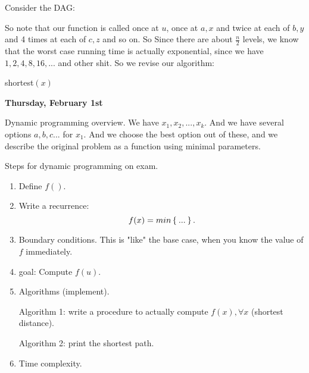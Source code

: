 \documentclass[reqno]{amsbook}
\makeatletter
\theoremstyle{plain}
\numberwithin{section}{chapter}
\numberwithin{equation}{chapter}
\theoremstyle{definition}
\theoremstyle{remark}
\newcommand{\fracc}{\frac}
\newenvironment{restoretext}%
    {\@parboxrestore%
     \begin{adjustwidth}{}{\leftmargin}%
    }{\end{adjustwidth}
     }
\makeatother
\begin{document}
Consider the DAG: 

\begin{center}
\end{center}

So note that our function is called once at $u$, once at $a,x$ and twice at each of $b,y$ and 4 times at each of $c,z$ and so on. So Since there are about $\fracc{n}{2}$ levels, we know that the worst case running time is actually exponential, since we have $1,2,4,8,16,...$ and other shit. So we revise our algorithm: 

 \begin{restoretext}
\begin{algorithm}[H]\label{alg1}
\caption{shortest$(x)$}
\end{algorithm}
\end{restoretext}


\vspace{10mm}
\textbf{Thursday, February 1st}

Dynamic programming overview. We have $x_1,x_2,...,x_k$. And we have several options $a,b,c...$ for $x_1$. And we choose the best option out of these, and we describe the original problem as a function using minimal parameters. 

Steps for dynamic programming on exam. 
\begin{enumerate}
\item Define $f()$. 
\item Write a recurrence: 
$$
f(x) = min\Set{...}.
$$
\item Boundary conditions. This is "like" the base case, when you know the value of $f$ immediately.
\item goal: Compute $f(u)$.  
\item Algorithms (implement). 

Algorithm 1: write a procedure to actually compute $f(x),\forall x$ (shortest distance). 

Algorithm 2: print the shortest path.

\item Time complexity. 
\end{enumerate}
\end{document}
